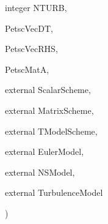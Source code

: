 {{\begin{DoxyParamCaption}
\item[{integer}]{N\-T\-U\-R\-B, }
\item[{}]{Petsc\-Vec\-D\-T, }
\item[{}]{Petsc\-Vec\-R\-H\-S, }
\item[{}]{Petsc\-Mat\-A, }
\item[{external}]{Scalar\-Scheme, }
\item[{external}]{Matrix\-Scheme, }
\item[{external}]{T\-Model\-Scheme, }
\item[{external}]{Euler\-Model, }
\item[{external}]{N\-S\-Model, }
\item[{external}]{Turbulence\-Model}
\end{DoxyParamCaption}
)}}\label{mpi_2setup_r_h_s_8_f_a718e288d437007ef5bc48b3f57941f65}
